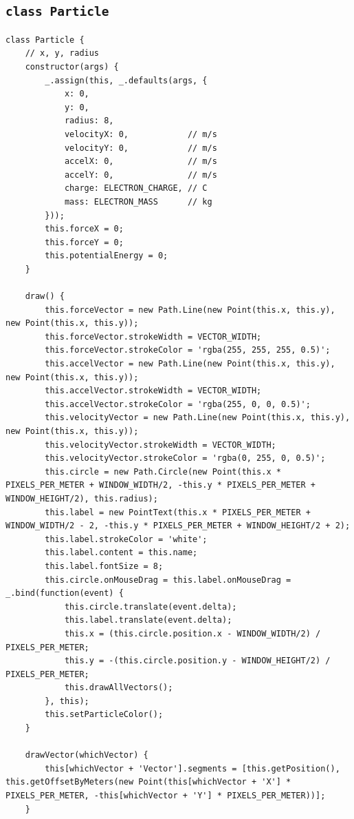 \documentclass[11pt]{article}
\begin{document}
\subsection{\texttt{class Particle}}
\label{sec-8-4}
\begin{verbatim}
class Particle {
    // x, y, radius
    constructor(args) {
        _.assign(this, _.defaults(args, {
            x: 0,
            y: 0,
            radius: 8,
            velocityX: 0,            // m/s
            velocityY: 0,            // m/s
            accelX: 0,               // m/s
            accelY: 0,               // m/s
            charge: ELECTRON_CHARGE, // C
            mass: ELECTRON_MASS      // kg
        }));
        this.forceX = 0;
        this.forceY = 0;
        this.potentialEnergy = 0;
    }

    draw() {
        this.forceVector = new Path.Line(new Point(this.x, this.y), new Point(this.x, this.y));
        this.forceVector.strokeWidth = VECTOR_WIDTH;
        this.forceVector.strokeColor = 'rgba(255, 255, 255, 0.5)';
        this.accelVector = new Path.Line(new Point(this.x, this.y), new Point(this.x, this.y));
        this.accelVector.strokeWidth = VECTOR_WIDTH;
        this.accelVector.strokeColor = 'rgba(255, 0, 0, 0.5)';
        this.velocityVector = new Path.Line(new Point(this.x, this.y), new Point(this.x, this.y));
        this.velocityVector.strokeWidth = VECTOR_WIDTH;
        this.velocityVector.strokeColor = 'rgba(0, 255, 0, 0.5)';
        this.circle = new Path.Circle(new Point(this.x * PIXELS_PER_METER + WINDOW_WIDTH/2, -this.y * PIXELS_PER_METER + WINDOW_HEIGHT/2), this.radius);
        this.label = new PointText(this.x * PIXELS_PER_METER + WINDOW_WIDTH/2 - 2, -this.y * PIXELS_PER_METER + WINDOW_HEIGHT/2 + 2);
        this.label.strokeColor = 'white';
        this.label.content = this.name;
        this.label.fontSize = 8;
        this.circle.onMouseDrag = this.label.onMouseDrag = _.bind(function(event) {
            this.circle.translate(event.delta);
            this.label.translate(event.delta);
            this.x = (this.circle.position.x - WINDOW_WIDTH/2) / PIXELS_PER_METER;
            this.y = -(this.circle.position.y - WINDOW_HEIGHT/2) / PIXELS_PER_METER;
            this.drawAllVectors();
        }, this);
        this.setParticleColor();
    }

    drawVector(whichVector) {
        this[whichVector + 'Vector'].segments = [this.getPosition(), this.getOffsetByMeters(new Point(this[whichVector + 'X'] * PIXELS_PER_METER, -this[whichVector + 'Y'] * PIXELS_PER_METER))];
    }


\end{verbatim}
\end{document}

